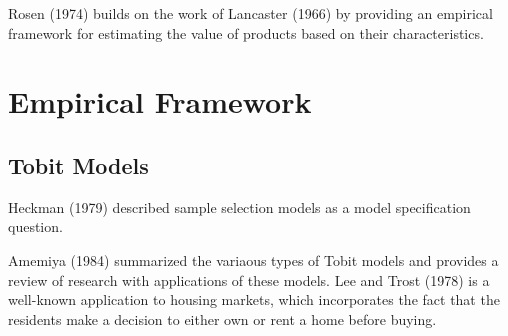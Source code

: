 Rosen (1974) builds on the work of Lancaster (1966)
by providing an empirical framework for estimating the value
of products based on their characteristics. 



\section{Empirical Framework}

\subsection{Tobit Models}

Heckman (1979) described sample selection models as a model specification question.

Amemiya (1984) summarized the variaous types of Tobit models
and provides a review of research with applications of these models. 
Lee and Trost (1978) is a well-known application to housing markets, 
which incorporates the fact that the residents make a decision
to either own or rent a home before buying. 


% 